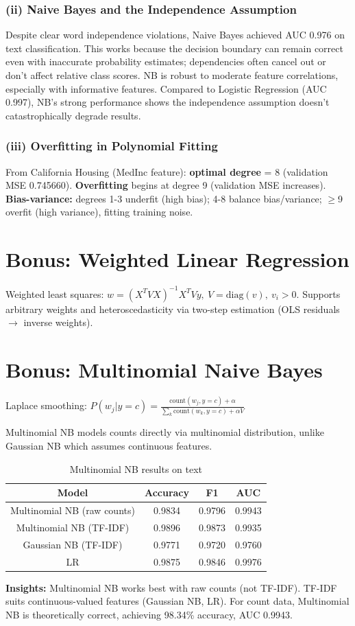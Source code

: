 \documentclass[12pt]{article}
\begin{document}
\subsubsection{(ii) Naive Bayes and the Independence Assumption}

Despite clear word independence violations, Naive Bayes achieved AUC 0.976 on text classification. This works because the decision boundary can remain correct even with inaccurate probability estimates; dependencies often cancel out or don't affect relative class scores. NB is robust to moderate feature correlations, especially with informative features. Compared to Logistic Regression (AUC 0.997), NB's strong performance shows the independence assumption doesn't catastrophically degrade results.

\subsubsection{(iii) Overfitting in Polynomial Fitting}

From California Housing (MedInc feature): \textbf{optimal degree} = 8 (validation MSE 0.745660). \textbf{Overfitting} begins at degree 9 (validation MSE increases). \textbf{Bias-variance:} degrees 1-3 underfit (high bias); 4-8 balance bias/variance; $\geq$9 overfit (high variance), fitting training noise.

\section{Bonus: Weighted Linear Regression}
Weighted least squares: $w = (X^T V X)^{-1} X^T V y,\ V=\text{diag}(v),\ v_i>0$.
Supports arbitrary weights and heteroscedasticity via two-step estimation (OLS residuals $\to$ inverse weights).
\section{Bonus: Multinomial Naive Bayes}
Laplace smoothing:
$P(w_j|y=c) = \frac{\text{count}(w_j,y=c)+\alpha}{\sum_k \text{count}(w_k,y=c)+\alpha V}$

Multinomial NB models counts directly via multinomial distribution, unlike Gaussian NB which assumes continuous features.

\begin{table}[H]
    \centering
    \caption{Multinomial NB results on text}
    \begin{tabular}{c c c c}
        \toprule
        Model & Accuracy & F1 & AUC \\
        \midrule
        Multinomial NB (raw counts) & 0.9834 & 0.9796 & 0.9943 \\
        Multinomial NB (TF-IDF) & 0.9896 & 0.9873 & 0.9935 \\
        Gaussian NB (TF-IDF) & 0.9771 & 0.9720 & 0.9760 \\
        LR & 0.9875 & 0.9846 & 0.9976 \\
        \bottomrule
    \end{tabular}
    \label{tab:multi}
\end{table}

\textbf{Insights:} Multinomial NB works best with raw counts (not TF-IDF). TF-IDF suits continuous-valued features (Gaussian NB, LR). For count data, Multinomial NB is theoretically correct, achieving 98.34\% accuracy, AUC 0.9943.
\end{document}
